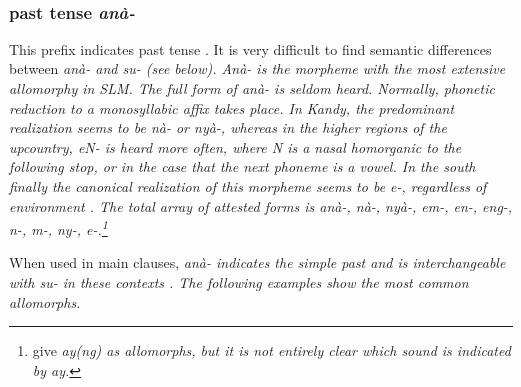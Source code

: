 
 \\ 





\subsubsection{past tense \em anà-\em}\label{sec:morph:ana-}
This prefix   indicates past tense . It is very difficult to find semantic differences between \em anà- \em and \em su- \em (see below). \em Anà- \em is the morpheme with the most extensive allomorphy in SLM.  The full form of \em anà- \em is seldom heard. Normally, phonetic reduction to a monosyllabic affix takes place. In Kandy, the predominant realization seems to be \em nà- \em or \em nyà-\em, whereas in the higher regions of the upcountry, \em eN- \em is heard more often, where N is a  nasal homorganic to the following stop, or  in the case that the next phoneme is a vowel. In the south finally the canonical realization of this morpheme seems to be \em e-\em, regardless of environment \citep{Ansaldo2009book}.
The total array of attested forms is \em anà-, nà-,  nyà-, em-, en-, eng-, n-, m-, ny-, e-\em.\footnote{\citet[164]{SmithEtAl2006cll} give \em ay(ng) \em as allomorphs, but it is not entirely clear which sound is indicated by \em ay\em.}

When used in main clauses, \em anà- \em indicates the simple past and is interchangeable with \em su- \em in these contexts \citep[cf.][167]{SmithEtAl2006cll}. The following examples show the most common allomorphs.
 
